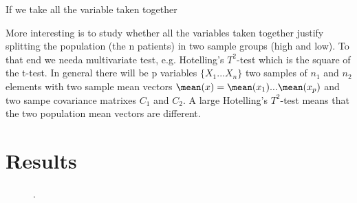 \documentclass[11pt, onecolumn]{article}
\begin{document}
If we take all the variable taken together 





More interesting is to study whether all the variables taken together justify splitting the population (the n patients) in two sample groups (high and low). To that end we needa multivariate test, e.g. Hotelling's $T^2$-test which is  the square of the t-test.
In general there will be p variables $\{X_1 ... X_n\}$ two samples of $n_1$ and $n_2$ elements with two sample mean vectors $\mean(x) = \mean(x_1) ...\mean(x_p)$ and two sampe covariance matrixes $C_1$ and $C_2$.   A large Hotelling's $T^2$-test means that the two population mean vectors are different. 
\section{Results}
\label{se:results}



\begin{figure}[H]
    \hfill

    \caption{.}
    \label{fig:sims1}
\end{figure}

%

\end{document}
